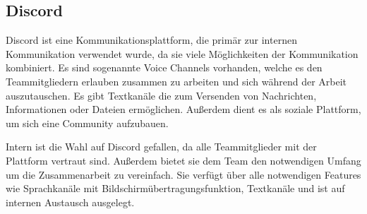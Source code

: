 %
\subsection{Discord}\label{subsec:Discord}
Discord ist eine Kommunikationsplattform, die primär zur internen Kommunikation verwendet wurde, da sie viele Möglichkeiten der Kommunikation kombiniert.
Es sind sogenannte Voice Channels vorhanden, welche es den Teammitgliedern erlauben zusammen zu arbeiten und sich während der Arbeit auszutauschen.
Es gibt Textkanäle die zum Versenden von Nachrichten, Informationen oder Dateien ermöglichen.
Außerdem dient es als soziale Plattform, um sich eine Community aufzubauen.

Intern ist die Wahl auf Discord gefallen, da alle Teammitglieder mit der Plattform vertraut sind.
Außerdem bietet sie dem Team den notwendigen Umfang um die Zusammenarbeit zu vereinfach.
Sie verfügt über alle notwendigen Features wie Sprachkanäle mit Bildschirmübertragungsfunktion, Textkanäle und ist auf internen Austausch ausgelegt.

%

\renewcommand{\kapitelautor}{}
